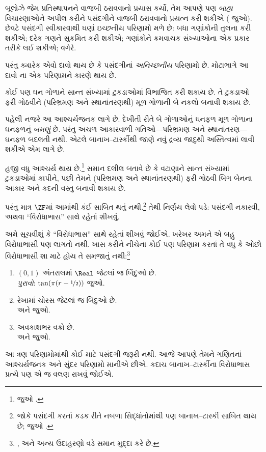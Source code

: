 \documentclass[../../../include/open-logic-section]{subfiles}
\begin{document}

બૂલોઝે જેમ પ્રતિસ્થાપનને વાજબી
ઠરાવવાનો પ્રયાસ કર્યો, તેમ આપણે
પણ \emph{બાહ્ય} વિચારણાઓને અપીલ
કરીને પસંદગીને વાજબી ઠરાવવાનો
પ્રયત્ન કરી શકીએ
( જુઓ).
છેવટે પસંદગી સ્વીકારવાથી ઘણાં
ઇચ્છનીય પરિણામો મળે છે: બધા ગણાંકોની
તુલના કરી શકીએ; દરેક ગણને સુક્રમિત
કરી શકીએ; ગણાંકોને ક્રમવાચક
સંખ્યાઓના એક પ્રકાર તરીકે લઈ શકીએ;
વગેરે.

પરંતુ ક્યારેક એવો દાવો થાય છે કે
પસંદગીનાં \emph{અનિચ્છનીય} પરિણામો
છે. મોટાભાગે આ દાવો
\cite{BanachTarski1924}ના એક
પરિણામને કારણે થાય છે.

\begin{thm}[બાનાખ--ટાર્સ્કીનો વિરોધાભાસ ($\ZFC$માં)]
કોઈ પણ ઘન ગોળાને સાન્ત સંખ્યામાં
ટુકડાઓમાં વિભાજિત કરી શકાય છે.
તે ટુકડાઓ ફરી ગોઠવીને (પરિભ્રમણ
અને સ્થાનાંતરણથી) મૂળ ગોળાની
બે નકલો બનાવી શકાય છે.
\end{thm}
\noindent
પહેલી નજરે આ આશ્ચર્યજનક લાગે છે.
દેખીતી રીતે બે ગોળાઓનું ઘનફળ
મૂળ ગોળાના ઘનફળનું \emph{બમણું} છે.
પરંતુ અચળ આકારવાળી ગતિઓ---પરિભ્રમણ
અને સ્થાનાંતરણ---ઘનફળ બદલતી નથી.
એટલે બાનાખ--ટાર્સ્કીથી જાણે
નવું દ્રવ્ય જાદુથી અસ્તિત્વમાં
લાવી શકીએ એમ લાગે છે.

હજી વધુ આશ્ચર્ય થાય છે.\footnote{જુઓ
\citet[Theorem 3.12]{Wagon2016}.}
સમાન દલીલ બતાવે છે કે વટાણાને
સાન્ત સંખ્યામાં ટુકડાઓમાં કાપીને,
પછી તેમને (પરિભ્રમણ અને સ્થાનાંતરણથી)
ફરી ગોઠવી બિગ બેનના આકાર અને
કદની વસ્તુ બનાવી શકાય છે.

પરંતુ માત્ર $\ZF$માં આમાંથી
કંઈ સાબિત થતું નથી.\footnote{જોકે
પસંદગી કરતાં કડક રીતે નબળા
સિદ્ધાંતોમાંથી પણ બાનાખ--ટાર્સ્કી
સાબિત થાય છે; જુઓ
\citet[303]{Wagon2016}.}
તેથી નિર્ણય લેવો પડે: પસંદગી નકારવી,
અથવા ``વિરોધાભાસ'' સાથે રહેતાં
શીખવું.

અમે સૂચવીશું કે ``વિરોધાભાસ''
સાથે રહેતાં શીખવું જોઈએ. ખરેખર
અમને એ બહુ વિરોધાભાસી પણ લાગતો
નથી. ખાસ કરીને નીચેના કોઈ પણ
પરિણામ કરતાં તે વધુ કે ઓછો
વિરોધાભાસી શા માટે હોય તે સમજાતું
નથી:\footnote{\citet[276--7]{Potter2004},
\citet[16]{Weston2003} અને
\citet[31, 308--9]{Wagon2016}
અન્ય ઉદાહરણો વડે સમાન મુદ્દા કરે છે.}
\begin{enumerate}
	\item $(0,1)$ અંતરાલમાં $\Real$ જેટલાં જ બિંદુઓ છે.
	\\\emph{પુરાવો}: $\tan(\pi(r-\nicefrac{1}{2}))$ જુઓ.
	\item રેખામાં ચોરસ જેટલાં જ બિંદુઓ છે.
	\\ અને
	 જુઓ.
	\item અવકાશભર વક્રો છે.
	\\ અને
	 જુઓ.
\end{enumerate}
આ ત્રણ પરિણામોમાંથી કોઈ માટે
પસંદગી જરૂરી નથી. આજે આપણે
તેમને ગણિતનાં આશ્ચર્યજનક અને
સુંદર પરિણામો માનીએ છીએ.
કદાચ બાનાખ--ટાર્સ્કીના વિરોધાભાસ
પ્રત્યે પણ એ જ વલણ રાખવું જોઈએ.
\end{document}
